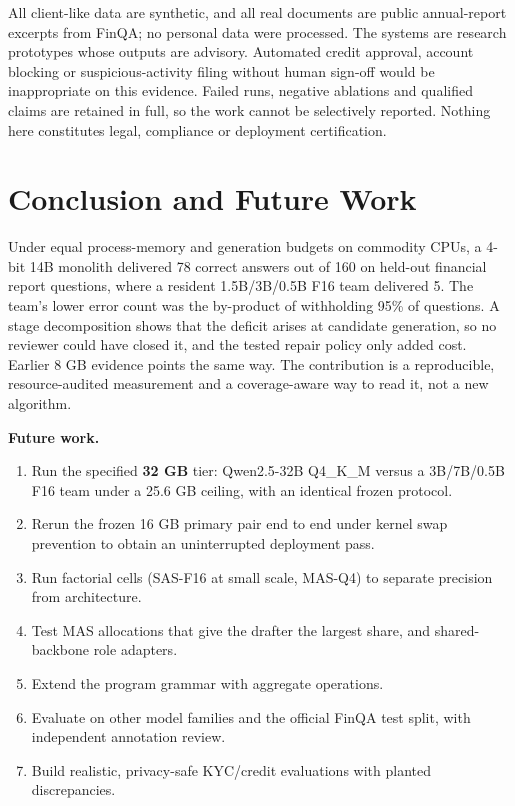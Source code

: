 \documentclass[letterpaper]{article}
\providecommand{\tightlist}{}
\begin{document}
All client-like data are synthetic, and all real documents are public annual-report excerpts from FinQA; no personal data were processed. The systems are research prototypes whose outputs are advisory. Automated credit approval, account blocking or suspicious-activity filing without human sign-off would be inappropriate on this evidence. Failed runs, negative ablations and qualified claims are retained in full, so the work cannot be selectively reported. Nothing here constitutes legal, compliance or deployment certification.

\section{Conclusion and Future Work}\label{conclusion-and-future-work}

Under equal process-memory and generation budgets on commodity CPUs, a 4-bit 14B monolith delivered 78 correct answers out of 160 on held-out financial report questions, where a resident 1.5B/3B/0.5B F16 team delivered 5. The team's lower error count was the by-product of withholding 95\% of questions. A stage decomposition shows that the deficit arises at candidate generation, so no reviewer could have closed it, and the tested repair policy only added cost. Earlier 8 GB evidence points the same way. The contribution is a reproducible, resource-audited measurement and a coverage-aware way to read it, not a new algorithm.

\textbf{Future work.}

\begin{enumerate}
\def\labelenumi{\arabic{enumi}.}
\tightlist
\item
  Run the specified \textbf{32 GB} tier: Qwen2.5-32B Q4\_K\_M versus a 3B/7B/0.5B F16 team under a 25.6 GB ceiling, with an identical frozen protocol.
\item
  Rerun the frozen 16 GB primary pair end to end under kernel swap prevention to obtain an uninterrupted deployment pass.
\item
  Run factorial cells (SAS-F16 at small scale, MAS-Q4) to separate precision from architecture.
\item
  Test MAS allocations that give the drafter the largest share, and shared-backbone role adapters.
\item
  Extend the program grammar with aggregate operations.
\item
  Evaluate on other model families and the official FinQA test split, with independent annotation review.
\item
  Build realistic, privacy-safe KYC/credit evaluations with planted discrepancies.
\end{enumerate}
\end{document}

